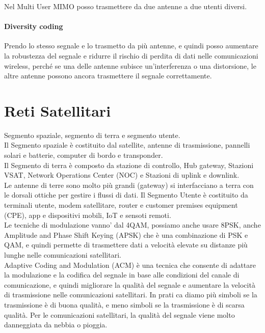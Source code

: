 Nel Multi User MIMO posso trasmettere da due antenne a due utenti diversi.\\

\paragraph{Diversity coding}
Prendo lo stesso segnale e lo trasmetto da più antenne, e quindi posso aumentare la robustezza del segnale e ridurre il rischio di perdita di dati nelle comunicazioni wireless, perché se una delle antenne subisce un'interferenza o una distorsione, le altre antenne possono ancora trasmettere il segnale correttamente.\\

\section{Reti Satellitari}
Segmento spaziale, segmento di terra e segmento utente.\\
Il Segmento spaziale è costituito dal satellite, antenne di trasmissione, pannelli solari e batterie, computer di bordo e transponder.\\
Il Segmento di terra è composto da stazione di controllo, Hub gateway, Stazioni VSAT, Network Operations Center (NOC) e Stazioni di uplink e downlink.\\
Le antenne di terre sono molto più grandi (gateway) si interfacciano a terra con le dorsali ottiche per gestire i flussi di dati.
Il Segmento Utente è costituito da terminali utente, modem satellitare, router e customer premises equipment (CPE), app e dispositivi mobili, IoT e sensoti remoti.\\

Le tecniche di modulazione vanno' dal 4QAM, possiamo anche usare 8PSK, anche Amplitude and Phase Shift Keying (APSK) che è una combinazione di PSK e QAM, e quindi permette di trasmettere dati a velocità elevate su distanze più lunghe nelle comunicazioni satellitari.\\
Adaptive Coding and Modulation (ACM) è una tecnica che consente di adattare la modulazione e la codifica del segnale in base alle condizioni del canale di comunicazione, e quindi migliorare la qualità del segnale e aumentare la velocità di trasmissione nelle comunicazioni satellitari. In prati ca diamo più simboli se la trasmissione è di buona qualità, e meno simboli se la trasmissione è di scarsa qualità. Per le comunicazioni satellitari, la qualità del segnale viene molto danneggiata da nebbia o pioggia.\\


